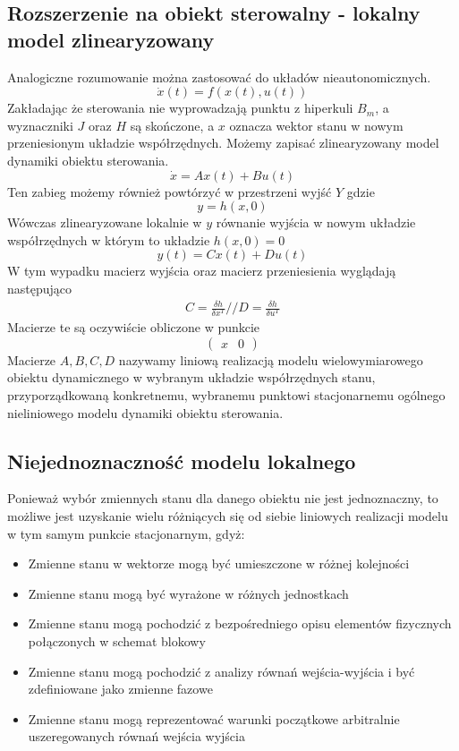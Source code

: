 \documentclass{article}
\begin{document}
	\subsection{Rozszerzenie na obiekt sterowalny - lokalny model zlinearyzowany}
		Analogiczne rozumowanie można zastosować do układów nieautonomicznych.
		\begin{equation}
			\dot{x}(t) = f(x(t), u(t))
		\end{equation}
		Zakładając że sterowania nie wyprowadzają punktu z hiperkuli $B_m$, a wyznaczniki 
		$J$ oraz $H$ są skończone, a $x$ oznacza wektor stanu w nowym przeniesionym układzie współrzędnych.
		Możemy zapisać zlinearyzowany model dynamiki obiektu sterowania.
		\begin{equation}
			\dot{x} = Ax(t) + Bu(t)
		\end{equation}
		Ten zabieg możemy również powtórzyć w przestrzeni wyjść $Y$ gdzie
		\begin{equation}
			y = h(x, 0)
		\end{equation}
		Wówczas zlinearyzowane lokalnie w $y$ równanie wyjścia w nowym układzie współrzędnych
		w którym to układzie $h(x, 0) = 0$
		\begin{equation}
			y(t) = Cx(t) + Du(t)
		\end{equation}
		W tym wypadku macierz wyjścia oraz macierz przeniesienia wyglądają następująco
		\begin{align*}
			C = \frac{\delta h}{\delta x^T} //
			D = \frac{\delta h}{\delta u^T} 
		\end{align*}
		Macierze te są oczywiście obliczone w punkcie 
		\begin{equation}
			\begin{pmatrix}
				x & 0
			\end{pmatrix}
		\end{equation}
		Macierze $A,B,C,D$ nazywamy
		liniową realizacją modelu wielowymiarowego obiektu
		dynamicznego w wybranym układzie współrzędnych stanu, przyporządkowaną
		konkretnemu, wybranemu punktowi stacjonarnemu ogólnego nieliniowego modelu
		dynamiki obiektu sterowania.
	\subsection{Niejednoznaczność modelu lokalnego}
		Ponieważ wybór zmiennych stanu dla danego obiektu nie jest jednoznaczny, to możliwe
		jest uzyskanie wielu różniących się od siebie liniowych realizacji modelu w tym samym
		punkcie stacjonarnym, gdyż:
		\begin{itemize}
			\item Zmienne stanu w wektorze mogą być umieszczone w różnej kolejności
			\item Zmienne stanu mogą być wyrażone w różnych jednostkach
			\item Zmienne stanu mogą pochodzić z bezpośredniego opisu elementów fizycznych
				połączonych w schemat blokowy
			\item Zmienne stanu mogą pochodzić z analizy równań wejścia-wyjścia i być
				zdefiniowane jako zmienne fazowe
			\item Zmienne stanu mogą reprezentować warunki początkowe arbitralnie
				uszeregowanych równań wejścia wyjścia
		\end{itemize}
\end{document}
